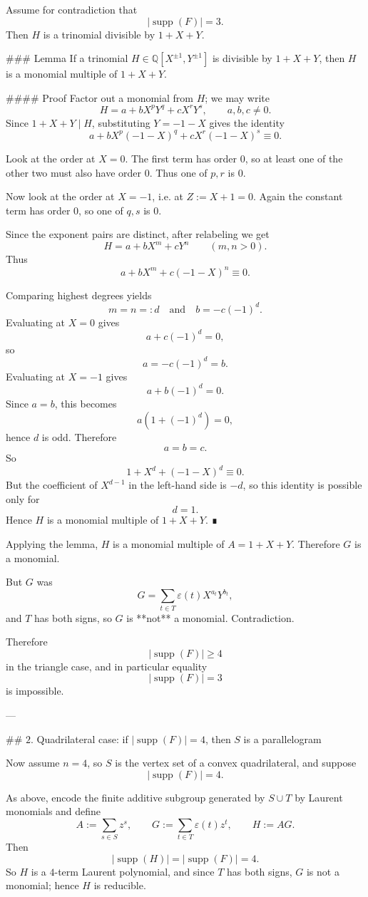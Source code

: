Assume for contradiction that
\[
|\operatorname{supp}(F)|=3.
\]
Then \(H\) is a trinomial divisible by \(1+X+Y\).

### Lemma
If a trinomial \(H\in \mathbb Q[X^{\pm1},Y^{\pm1}]\) is divisible by \(1+X+Y\), then \(H\) is a monomial multiple of \(1+X+Y\).

#### Proof
Factor out a monomial from \(H\); we may write
\[
H=a+bX^{p}Y^{q}+cX^{r}Y^{s},
\qquad a,b,c\neq 0.
\]
Since \(1+X+Y\mid H\), substituting \(Y=-1-X\) gives the identity
\[
a+bX^{p}(-1-X)^q+cX^{r}(-1-X)^s\equiv 0.
\]

Look at the order at \(X=0\). The first term has order \(0\), so at least one of the other two must also have order \(0\). Thus one of \(p,r\) is \(0\).

Now look at the order at \(X=-1\), i.e. at \(Z:=X+1=0\). Again the constant term has order \(0\), so one of \(q,s\) is \(0\).

Since the exponent pairs are distinct, after relabeling we get
\[
H=a+bX^m+cY^n
\qquad (m,n>0).
\]
Thus
\[
a+bX^m+c(-1-X)^n\equiv 0.
\]

Comparing highest degrees yields
\[
m=n=:d
\quad\text{and}\quad
b=-c(-1)^d.
\]
Evaluating at \(X=0\) gives
\[
a+c(-1)^d=0,
\]
so
\[
a=-c(-1)^d=b.
\]
Evaluating at \(X=-1\) gives
\[
a+b(-1)^d=0.
\]
Since \(a=b\), this becomes
\[
a(1+(-1)^d)=0,
\]
hence \(d\) is odd. Therefore
\[
a=b=c.
\]
So
\[
1+X^d+(-1-X)^d\equiv 0.
\]
But the coefficient of \(X^{d-1}\) in the left-hand side is \(-d\), so this identity is possible only for
\[
d=1.
\]
Hence \(H\) is a monomial multiple of \(1+X+Y\). ∎

Applying the lemma, \(H\) is a monomial multiple of \(A=1+X+Y\). Therefore \(G\) is a monomial.

But \(G\) was
\[
G=\sum_{t\in T}\varepsilon(t)X^{a_t}Y^{b_t},
\]
and \(T\) has both signs, so \(G\) is **not** a monomial. Contradiction.

Therefore
\[
|\operatorname{supp}(F)|\ge 4
\]
in the triangle case, and in particular equality
\[
|\operatorname{supp}(F)|=3
\]
is impossible.

---

## \(2.\) Quadrilateral case: if \( |\operatorname{supp}(F)|=4 \), then \(S\) is a parallelogram

Now assume \(n=4\), so \(S\) is the vertex set of a convex quadrilateral, and suppose
\[
|\operatorname{supp}(F)|=4.
\]

As above, encode the finite additive subgroup generated by \(S\cup T\) by Laurent monomials and define
\[
A:=\sum_{s\in S} z^s,
\qquad
G:=\sum_{t\in T}\varepsilon(t) z^t,
\qquad
H:=AG.
\]
Then
\[
|\operatorname{supp}(H)|=|\operatorname{supp}(F)|=4.
\]
So \(H\) is a \(4\)-term Laurent polynomial, and since \(T\) has both signs, \(G\) is not a monomial; hence \(H\) is reducible.

